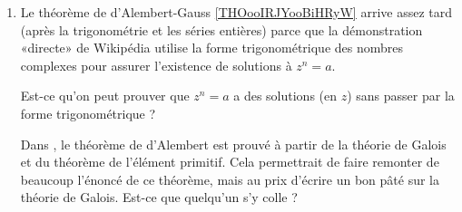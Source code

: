 \begin{enumerate}
    \item
        Le théorème de d'Alembert-Gauss \ref{THOooIRJYooBiHRyW} arrive assez tard (après la trigonométrie et les séries entières) parce que la démonstration «directe»  de Wikipédia utilise la forme trigonométrique des nombres complexes pour assurer l'existence de solutions à \( z^n=a\).

             Est-ce qu'on peut prouver que \( z^n=a\) a des solutions (en \( z\)) sans passer par la forme trigonométrique ?
        
             Dans \cite{rqrNyg}, le théorème de d'Alembert est prouvé à partir de la théorie de Galois et du théorème de l'élément primitif. Cela permettrait de faire remonter de beaucoup l'énoncé de ce théorème, mais au prix d'écrire un bon pâté sur la théorie de Galois. Est-ce que quelqu'un s'y colle ?


\end{enumerate}
